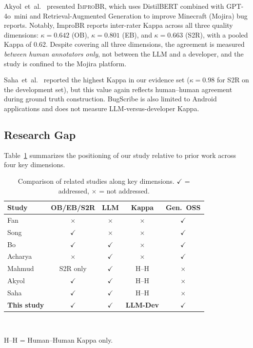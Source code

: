 Akyol~et~al.~\cite{akyol2026improbr} presented \textsc{ImproBR},
which uses DistilBERT combined with GPT-4o~mini and
Retrieval-Augmented Generation to improve Minecraft (Mojira) bug
reports.  Notably, ImproBR reports inter-rater Kappa across all
three quality dimensions: $\kappa = 0.642$ (OB), $\kappa = 0.801$
(EB), and $\kappa = 0.663$ (S2R), with a pooled Kappa of 0.62.
Despite covering all three dimensions, the agreement is measured
\emph{between human annotators only}, not between the LLM and a
developer, and the study is confined to the Mojira platform.

Saha~et~al.~\cite{saha2026bugscribe} reported the highest Kappa in
our evidence set ($\kappa = 0.98$ for S2R on the development set),
but this value again reflects human--human agreement during ground
truth construction.  BugScribe is also limited to Android
applications and does not measure LLM-versus-developer Kappa.

\subsection{Research Gap}
\label{sec:related:gap}

Table~\ref{tab:related_summary} summarizes the positioning of our
study relative to prior work across four key dimensions.

\begin{table}[htbp]
\centering
\caption{Comparison of related studies along key dimensions.
         $\checkmark$ = addressed, $\times$ = not addressed.}
\label{tab:related_summary}
\small
\begin{tabular}{lcccc}
\hline
\textbf{Study} &
  \textbf{OB/EB/S2R} &
  \textbf{LLM} &
  \textbf{Kappa} &
  \textbf{Gen.\ OSS} \\
\hline
Fan~\cite{fan2020chaff}             & $\times$    & $\times$ & $\times$ & $\checkmark$ \\
Song~\cite{song2020bee}             & $\checkmark$ & $\times$ & $\times$ & $\checkmark$ \\
Bo~\cite{bo2024chatbr}              & $\checkmark$ & $\checkmark$ & $\times$ & $\checkmark$ \\
Acharya~\cite{acharya2025enhance}   & $\times$    & $\checkmark$ & $\times$ & $\checkmark$ \\
Mahmud~\cite{mahmud2025astrobr}     & S2R only     & $\checkmark$ & H--H     & $\times$ \\
Akyol~\cite{akyol2026improbr}       & $\checkmark$ & $\checkmark$ & H--H     & $\times$ \\
Saha~\cite{saha2026bugscribe}       & $\checkmark$ & $\checkmark$ & H--H     & $\times$ \\
\hline
\textbf{This study}                 & $\checkmark$ & $\checkmark$ & \textbf{LLM-Dev} & $\checkmark$ \\
\hline
\end{tabular}
\\[4pt]
\raggedright\footnotesize H--H = Human--Human Kappa only.
\end{table}

